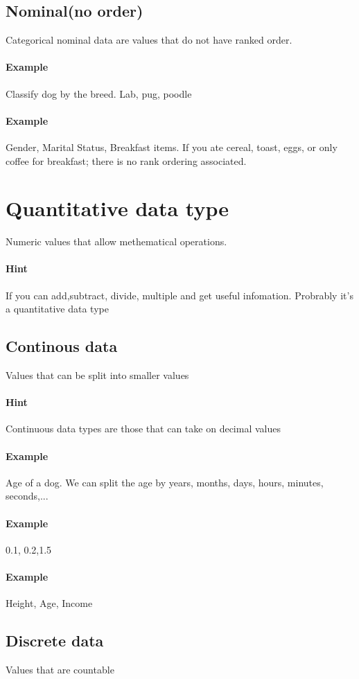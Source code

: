 \documentclass[]{article}
\begin{document}
\subsection{Nominal(no order)}
Categorical nominal data are values that do not have ranked order.
\paragraph{Example} Classify dog by the breed. Lab, pug, poodle
\paragraph{Example} Gender, Marital Status, Breakfast items. If you ate cereal, toast, eggs, or only coffee for breakfast; there is no rank ordering associated.

\section{Quantitative data type}
Numeric values that allow methematical operations.
\paragraph{Hint} If you can add,subtract, divide, multiple and get useful infomation. Probrably it's a quantitative data type
\subsection{Continous data}
Values that can be split into smaller values
\paragraph{Hint} Continuous data types are those that can take on decimal values
\paragraph{Example} Age of a dog. We can split the age by years, months, days, hours, minutes, seconds,...
\paragraph{Example} 0.1, 0.2,1.5
\paragraph{Example} Height, Age, Income

\subsection{Discrete data}
Values that are countable
\end{document}
